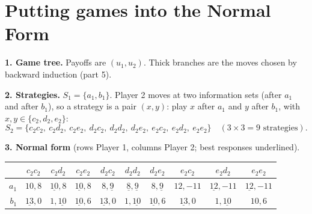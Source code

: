 \documentclass[11pt]{article}
\begin{document}
\section{Putting games into the Normal Form}

\textbf{1. Game tree.} Payoffs are $(u_1,u_2)$. Thick branches are the moves chosen by backward induction (part 5).
\begin{center}
\end{center}

\textbf{2. Strategies.} $S_1=\{a_1,b_1\}$. Player 2 moves at two information sets (after $a_1$ and after $b_1$), so a strategy is a pair $(x,y)$: play $x$ after $a_1$ and $y$ after $b_1$, with $x,y\in\{c_2,d_2,e_2\}$:
\[
S_2=\{c_2c_2,\ c_2d_2,\ c_2e_2,\ d_2c_2,\ d_2d_2,\ d_2e_2,\ e_2c_2,\ e_2d_2,\ e_2e_2\}\quad(3\times3=9\text{ strategies}).
\]

\textbf{3. Normal form} (rows Player 1, columns Player 2; best responses underlined).
\begin{center}
\small
\setlength{\tabcolsep}{4pt}
\begin{tabular}{r|ccccccccc}
 & $c_2c_2$ & $c_2d_2$ & $c_2e_2$ & $d_2c_2$ & $d_2d_2$ & $d_2e_2$ & $e_2c_2$ & $e_2d_2$ & $e_2e_2$ \\ \hline
$a_1$ & $10,8$ & $\underline{10},8$ & $\underline{10},8$ & $8,\underline{9}$ & $\underline{8},\underline{9}$ & $8,\underline{9}$ & $12,-11$ & $\underline{12},-11$ & $\underline{12},-11$ \\
$b_1$ & $\underline{13},0$ & $1,\underline{10}$ & $\underline{10},6$ & $\underline{13},0$ & $1,\underline{10}$ & $\underline{10},6$ & $\underline{13},0$ & $1,\underline{10}$ & $10,6$
\end{tabular}
\end{center}
\end{document}
